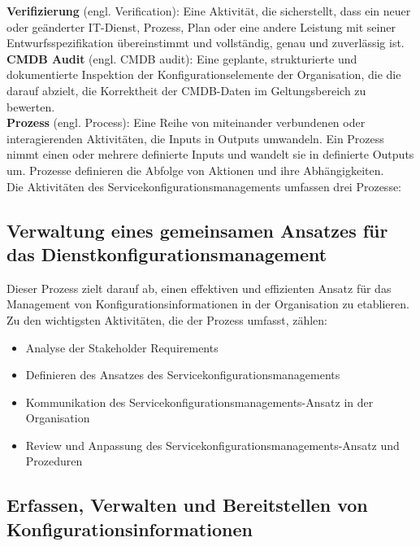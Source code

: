 \noindent
\textbf{Verifizierung} 
(engl. Verification):
Eine Aktivität, die sicherstellt, dass ein neuer oder geänderter IT-Dienst, Prozess, Plan oder eine andere Leistung
mit seiner Entwurfsspezifikation übereinstimmt und vollständig, genau und zuverlässig ist. \\

\noindent
\textbf{CMDB Audit} 
(engl. CMDB audit):
Eine geplante, strukturierte und dokumentierte Inspektion der Konfigurationselemente der Organisation, die
die darauf abzielt, die Korrektheit der CMDB-Daten im Geltungsbereich zu bewerten. \\

\noindent
\textbf{Prozess} 
(engl. Process):
Eine Reihe von miteinander verbundenen oder interagierenden Aktivitäten, die Inputs in Outputs umwandeln. Ein Prozess nimmt
einen oder mehrere definierte Inputs und wandelt sie in definierte Outputs um. Prozesse definieren die Abfolge von
Aktionen und ihre Abhängigkeiten. \\

\noindent
Die Aktivitäten des Servicekonfigurationsmanagements umfassen drei Prozesse:

\subsection*{Verwaltung eines gemeinsamen Ansatzes für das Dienstkonfigurationsmanagement}

Dieser Prozess zielt darauf ab, einen effektiven und effizienten Ansatz für das Management von
Konfigurationsinformationen in der Organisation zu etablieren. 
Zu den wichtigsten Aktivitäten, die der Prozess umfasst, zählen:

\begin{itemize}
	\item Analyse der Stakeholder Requirements
	\item Definieren des Ansatzes des Servicekonfigurationsmanagements
	\item Kommunikation des Servicekonfigurationsmanagements-Ansatz in der Organisation
	\item Review und Anpassung des Servicekonfigurationsmanagements-Ansatz und Prozeduren
\end{itemize}

\subsection*{Erfassen, Verwalten und Bereitstellen von Konfigurationsinformationen}

